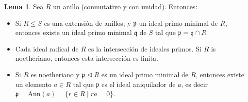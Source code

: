 \documentclass[letterpaper]{article}
\def\p{\mathfrak{p}}
\def\q{\mathfrak{q}}
\theoremstyle{definition}
\newtheorem{lem}[Satz]{Lema}
\begin{document}
\begin{lem}\label{commalg}
Sea $R$ un anillo (conmutativo y con unidad). Entonces:
\begin{itemize}
\item Si $R \leq S$ es una extensi\'on de anillos, y $\p$ un ideal primo minimal de $R$, entonces existe un ideal primo minimal $\q$ de $S$ tal que $\p = \q \cap R$
\item Cada ideal radical de $R$ es la intersecci\'on de ideales primos. Si $R$ is noetheriano, entonces esta intersecci\'on es finita.
\item Si $R$ es noetheriano y $\p \unlhd R$ es un ideal primo minimal de $R$, entonces existe un elemento $a \in R$ tal que $\p$ es el ideal aniquilador de $a$, es decir $\p = \text{Ann}(a) = \{ r \in R \mid ra = 0 \}$.
\end{itemize}
\end{lem}
\end{document}
